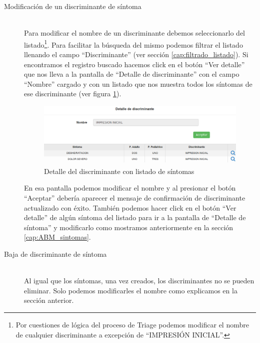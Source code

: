 \begin{description}
\item[Modificación de un discriminante de síntoma] \mbox{} \\
Para modificar el nombre de un discriminante debemos seleccionarlo del listado\footnote{Por cuestiones de lógica del proceso de Triage podemos modificar el nombre de cualquier discriminante a excepción de ``IMPRESIÓN INICIAL''.}. Para facilitar la búsqueda del mismo podemos filtrar el listado llenando el campo ``Discriminante'' (ver sección \ref{cap:filtrado_listado}). Si encontramos el registro buscado hacemos click en el botón ``Ver detalle'' que nos lleva a la pantalla de ``Detalle de discriminante'' con el campo ``Nombre'' cargado y con un listado que nos muestra todos los síntomas de ese discriminante (ver figura \ref{fig:detalle_discriminante}).
\begin{figure}
\centerline{\includegraphics[width=1\textwidth]{listado_sintomas_de_discriminante.png}}
\caption{Detalle del discriminante con listado de síntomas}
\label{fig:detalle_discriminante}
\end{figure}
En esa pantalla podemos modificar el nombre y al presionar el botón ``Aceptar'' debería aparecer el mensaje de confirmación de discriminante actualizado con éxito. También podemos hacer click en el botón ``Ver detalle'' de algún síntoma del listado para ir a la pantalla de ``Detalle de síntoma'' y modificarlo como mostramos anteriormente en la sección \ref{cap:ABM_sintomas}.

\item[Baja de discriminante de síntoma] \mbox{} \\
Al igual que los síntomas, una vez creados, los discriminantes no se pueden eliminar. Solo podemos modificarles el nombre como explicamos en la sección anterior.
\end{description}

